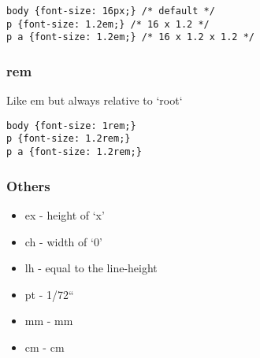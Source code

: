 \begin{verbatim}
body {font-size: 16px;} /* default */
p {font-size: 1.2em;} /* 16 x 1.2 */
p a {font-size: 1.2em;} /* 16 x 1.2 x 1.2 */
\end{verbatim}

\subsubsection{rem}

Like em but always relative to `root`

\begin{verbatim}
body {font-size: 1rem;}
p {font-size: 1.2rem;}
p a {font-size: 1.2rem;}
\end{verbatim}


\subsubsection{Others}

\begin{itemize}
    \item ex - height of ‘x’
    \item ch - width of ‘0’
    \item lh - equal to the line-height
    \item pt - 1/72“
    \item mm - mm
    \item cm - cm
\end{itemize}


